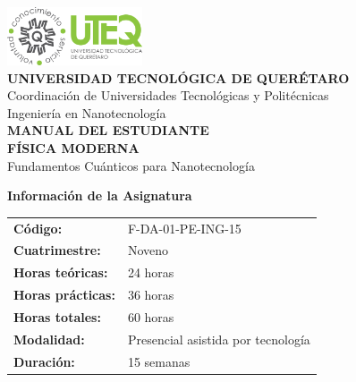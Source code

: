 \begin{tecnologiabox}
\begin{tecnologiabox}
\begin{tecnologiabox}
\begin{teknologiabox}
\begin{tecnologiabox}
\begin{tecnologiabox}
\begin{tecnologiabox}
\newcommand{\nivel}[1]{\textcolor{uteqblue}{\textbf{#1}}}
\newcommand{\destaque}[1]{\textcolor{uteqorange}{\textbf{#1}}}
\newcommand{\importante}[1]{\textcolor{red}{\textbf{#1}}}



\begin{titlepage}
\begin{center}
	
	\includegraphics[width=4cm]{../../Imagenes/Logo_uteq}\\[1cm]
	
	{\large \textcolor{uteqblue}{\textbf{UNIVERSIDAD TECNOLÓGICA DE QUERÉTARO}}}\\[0.3cm]
	{\normalsize \textcolor{uteqgray}{Coordinación de Universidades Tecnológicas y Politécnicas}}\\[0.2cm]
	{\normalsize \textcolor{uteqgray}{Ingeniería en Nanotecnología}}\\[2cm]
	
	{\Huge \textcolor{uteqblue}{\textbf{MANUAL DEL ESTUDIANTE}}}\\[1cm]
	
	{\LARGE \textcolor{uteqgray}{\textbf{FÍSICA MODERNA}}}\\[0.5cm]
	{\large \textcolor{uteqgray}{Fundamentos Cuánticos para Nanotecnología}}\\[3cm]
	
	\begin{tcolorbox}[colback=uteqblue!10!white,colframe=uteqblue,width=14cm]
		\begin{center}
			\textbf{Información de la Asignatura}\\[0.5cm]
			\begin{tabular}{ll}
				\textbf{Código:} & F-DA-01-PE-ING-15 \\
				\textbf{Cuatrimestre:} & Noveno \\
				\textbf{Horas teóricas:} & 24 horas \\
				\textbf{Horas prácticas:} & 36 horas \\
				\textbf{Horas totales:} & 60 horas \\
				\textbf{Modalidad:} & Presencial asistida por tecnología \\
				\textbf{Duración:} & 15 semanas \\
			\end{tabular}
		\end{center}
	\end{tcolorbox}
	

\end{center}
\end{titlepage}
\end{tecnologiabox}
\end{tecnologiabox}
\end{tecnologiabox}
\end{teknologiabox}
\end{tecnologiabox}
\end{tecnologiabox}
\end{tecnologiabox}
